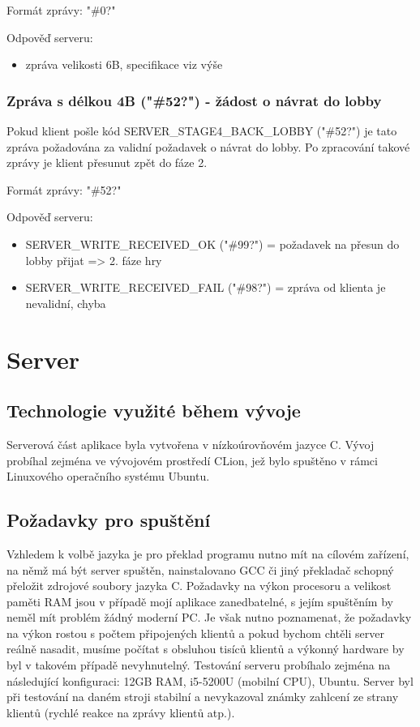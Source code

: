 \documentclass[12pt, a4paper, pdftex, czech, titlepage]{report}
\begin{document}
Formát zprávy: "\#0?" 

Odpověď serveru:
\begin{itemize}
\item zpráva velikosti 6B, specifikace viz výše 
\end{itemize}

\subsubsection{Zpráva s délkou 4B ("\#52?") - žádost o návrat do lobby}
Pokud klient pošle kód SERVER\_STAGE4\_BACK\_LOBBY ("\#52?") je tato zpráva
požadována za validní požadavek o návrat do lobby. Po zpracování
takové zprávy je klient přesunut zpět do fáze 2.

Formát zprávy: "\#52?"

Odpověď serveru:
\begin{itemize}
\item SERVER\_WRITE\_RECEIVED\_OK ("\#99?") = požadavek na přesun do lobby přijat => 2. fáze hry
\item SERVER\_WRITE\_RECEIVED\_FAIL ("\#98?") = zpráva od klienta je nevalidní, chyba
\end{itemize}

\section{Server}
\subsection{Technologie využité během vývoje}
Serverová část aplikace byla vytvořena v nízkoúrovňovém jazyce C.
Vývoj probíhal zejména ve vývojovém prostředí CLion, jež bylo spuštěno v rámci Linuxového operačního
systému Ubuntu.

\subsection{Požadavky pro spuštění}
Vzhledem k volbě jazyka je pro překlad programu nutno mít
na cílovém zařízení, na němž má být server spuštěn, nainstalovano GCC či jiný překladač
schopný přeložit zdrojové soubory jazyka C. Požadavky na výkon procesoru
a velikost paměti RAM jsou v případě mojí aplikace zanedbatelné, 
s jejím spuštěním by neměl mít problém žádný moderní PC. Je však
nutno poznamenat, že požadavky na výkon rostou s počtem
připojených klientů a pokud bychom chtěli server reálně nasadit, musíme počítat
s obsluhou tisíců klientů a výkonný hardware by byl v takovém případě
nevyhnutelný. Testování serveru probíhalo zejména na následující konfiguraci: 
12GB RAM, i5-5200U (mobilní CPU), Ubuntu. Server byl při testování na daném stroji stabilní
a nevykazoval známky zahlcení ze strany klientů (rychlé reakce na zprávy klientů atp.).
\end{document}
